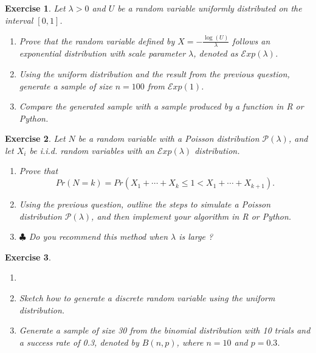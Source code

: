 \documentclass{article}\usepackage[]{graphicx}\usepackage[]{xcolor}
\newtheorem{exercise}{Exercise}
\begin{document}
\begin{exercise}

Let $\lambda>0$ and $U$ be a random variable uniformly distributed on the interval $[0,1]$.
\begin{enumerate}
\item Prove that the random variable defined by $X = -\frac{\log(U)}{\lambda}$ follows an exponential distribution with scale parameter $\lambda$, denoted as $\mathcal{E}xp(\lambda)$.
\item Using the uniform distribution and the result from the previous question, generate a sample of size $n=100$ from $\mathcal{E}xp(1)$.
\item Compare the generated sample with a sample produced by a function in R or Python.
\end{enumerate}
\end{exercise}

\begin{exercise}
Let $N$ be a random variable with a Poisson distribution $\mathcal{P}(\lambda)$, and let $X_i$ be i.i.d. random variables with an $\mathcal{E}xp(\lambda)$ distribution.
\begin{enumerate}
\item Prove that 
\begin{equation*}
Pr(N = k) = Pr(X_1+\cdots+X_k \leq 1 < X_1 + \cdots + X_{k+1}).
\end{equation*}
\item Using the previous question, outline the steps to simulate a Poisson distribution $\mathcal{P}(\lambda)$, and then implement your algorithm in R or Python.
\item $\clubsuit$ Do you recommend this method when $\lambda$ is large ?
\end{enumerate}
\end{exercise}

\begin{exercise}
\begin{enumerate}
\item[]
\item Sketch how to generate a discrete random variable using the uniform distribution.
\item Generate a sample of size 30 from the binomial distribution with 10 trials and a success rate of 0.3, denoted by $B(n,p)$, where $n = 10$ and $p = 0.3$.
\end{enumerate}
\end{exercise}

\end{document}
